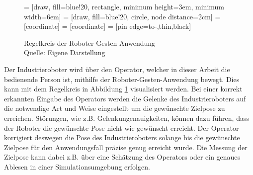 \begin{figure}[!h]
     = [draw, fill=blue!20, rectangle, minimum height=3em, minimum width=6em]
     = [draw, fill=blue!20, circle, node distance=2cm]
     = [coordinate]
     = [coordinate]
     = [pin edge={to-,thin,black}]

    \centering
    \newline
    \caption[Regelkreis der Roboter-Gesten-Anwendung]{Regelkreis der Roboter-Gesten-Anwendung\\Quelle: Eigene Darstellung}
    \label{fig:regelkreis_tir}
\end{figure}\FloatBarrier

Der Industrieroboter wird über den Operator, welcher in dieser Arbeit die bedienende Person ist, mithilfe der Roboter-Gesten-Anwendung bewegt. Dies kann mit dem Regelkreis in Abbildung \ref{fig:regelkreis_tir} visualisiert werden. Bei einer korrekt erkannten Eingabe des Operators werden die Gelenke des Industrieroboters auf die notwendige Art und Weise eingestellt um die gewünschte Zielpose zu erreichen. Störungen, wie z.B. Gelenkungenauigkeiten, können dazu führen, dass der Roboter die gewünschte Pose nicht wie gewünscht erreicht. Der Operator korrigiert deswegen die Pose des Industrieroboters solange bis die gewünschte Zielpose für den Anwendungsfall präzise genug erreicht wurde. Die Messung der Zielpose kann dabei z.B. über eine Schätzung des Operators oder ein genaues Ablesen in einer Simulationsumgebung erfolgen.

